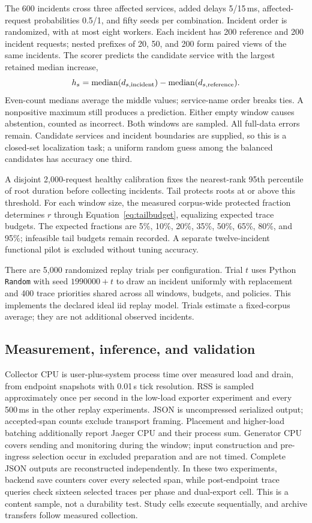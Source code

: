The 600 incidents cross three affected services, added delays 5/15\,ms, affected-request probabilities 0.5/1, and fifty seeds per combination. Incident order is randomized, with at most eight workers. Each incident has 200 reference and 200 incident requests; nested prefixes of 20, 50, and 200 form paired views of the same incidents. The scorer predicts the candidate service with the largest retained median increase,
\begin{equation}\label{eq:scorer}
 h_s=\operatorname{median}(d_{s,\rm incident})-
     \operatorname{median}(d_{s,\rm reference}).
\end{equation}
Even-count medians average the middle values; service-name order breaks ties. A nonpositive maximum still produces a prediction. Either empty window causes abstention, counted as incorrect. Both windows are sampled. All full-data errors remain. Candidate services and incident boundaries are supplied, so this is a closed-set localization task; a uniform random guess among the balanced candidates has accuracy one third.

A disjoint 2,000-request healthy calibration fixes the nearest-rank 95th percentile of root duration before collecting incidents. Tail protects roots at or above this threshold. For each window size, the measured corpus-wide protected fraction determines $r$ through Equation~\eqref{eq:tailbudget}, equalizing expected trace budgets. The expected fractions are 5\%, 10\%, 20\%, 35\%, 50\%, 65\%, 80\%, and 95\%; infeasible tail budgets remain recorded. A separate twelve-incident functional pilot is excluded without tuning accuracy.

There are 5,000 randomized replay trials per configuration. Trial $t$ uses Python \texttt{Random} with seed $1990000+t$ to draw an incident uniformly with replacement and 400 trace priorities shared across all windows, budgets, and policies. This implements the declared ideal iid replay model. Trials estimate a fixed-corpus average; they are not additional observed incidents.

\subsection{Measurement, inference, and validation}\label{sec:validation-method}
Collector CPU is user-plus-system process time over measured load and drain, from endpoint snapshots with 0.01\,s tick resolution. RSS is sampled approximately once per second in the low-load exporter experiment and every 500\,ms in the other replay experiments. JSON is uncompressed serialized output; accepted-span counts exclude transport framing. Placement and higher-load batching additionally report Jaeger CPU and their process sum. Generator CPU covers sending and monitoring during the window; input construction and pre-ingress selection occur in excluded preparation and are not timed. Complete JSON outputs are reconstructed independently. In these two experiments, backend save counters cover every selected span, while post-endpoint trace queries check sixteen selected traces per phase and dual-export cell. This is a content sample, not a durability test. Study cells execute sequentially, and archive transfers follow measured collection.

